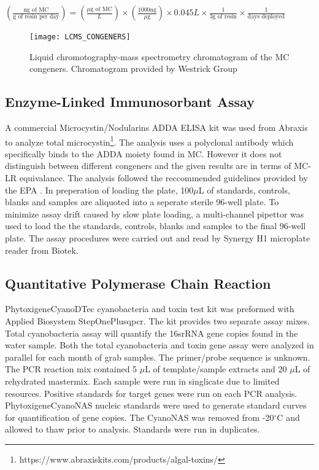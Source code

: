\begin {center} 
$(\frac{\text{ng of MC}}{\text{g of resin per day}}) =(\frac{\text{$\mu$g of MC}}{L}) \times (\frac{\text{1000ng}}{\text{$\mu$g}}) \times {0.045L} \times \frac{1}{\text{3g of resin}} \times \frac{1}{\text{days deployed}}$
\end{center}


\begin{figure}[!h]
\centering
\texttt{[image: LCMS\_CONGENERS]}
\caption{Liquid chromotography-mass spectrometry chromatogram of the MC congeners. Chromatogram provided by Westrick Group}
\label{fig:spectra}
\end{figure}

\clearpage

\subsection{Enzyme-Linked Immunosorbant Assay}

A commercial Microcystin/Nodularins ADDA ELISA kit was used from Abraxis to analyze total microcystin\footnote{https://www.abraxiskits.com/products/algal-toxins/}. The analysis uses a polyclonal antibody which specifically binds to the ADDA moiety found in MC. However it does not distinguish between different congeners and the given results are in terms of MC-LR equivalance. The analysis followed the reccommended guidelines provided by the EPA \cite{usepa_method_2016}. In preperation of loading the plate,  100$\mu$L of standards, controls, blanks and samples are aliquoted into a seperate sterile 96-well plate. To minimize assay drift caused by slow plate loading, a multi-channel pipettor was used to load the the standards, controls, blanks and samples to the final 96-well plate. The assay procedures were carried out and read by Synergy H1 microplate reader from Biotek.

\subsection{Quantitative Polymerase Chain Reaction}

Phytoxigene\texttrademark  CyanoDTec cyanobacteria and toxin test kit was preformed with Applied Biosystem StepOnePlus\texttrademark \gls{qpcr}. The kit provides two separate assay mixes. Total cyanobacteria assay will quantify the 16srRNA gene copies found in the water sample. Both the total cyanobacteria and toxin gene assay  were analyzed in parallel for each month of grab samples. The primer/probe sequence is unknown.  The PCR reaction mix contained 5 $\mu$L of template/sample extracts and 20 $\mu$L of rehydrated mastermix.  Each sample were run in singlicate due to limited resources. Positive standards for target genes  were run on each PCR analysis. Phytoxigene\texttrademark  CyanoNAS nucleic standards were used to generate standard curves for quantification of gene copies. The CyanoNAS was removed from -20$^\circ$C and allowed to thaw prior to analysis.  Standards were run in duplicates.

